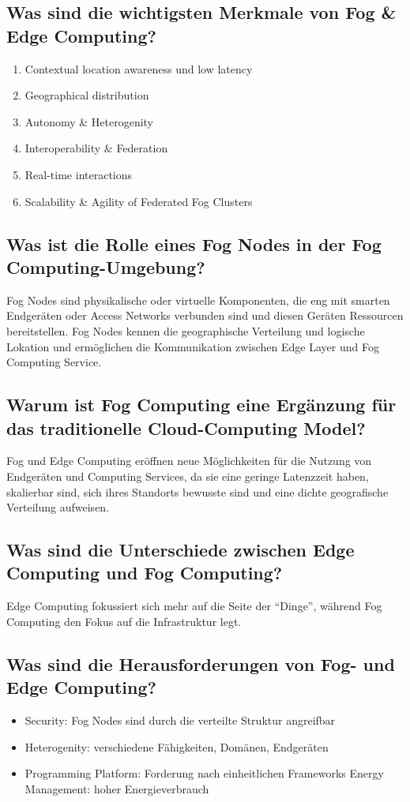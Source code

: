 \documentclass{article}
\begin{document}
\subsection{Was sind die wichtigsten Merkmale von Fog \& Edge Computing?}
\begin{enumerate}
    \item Contextual location awareness und low latency
    \item Geographical distribution
    \item Autonomy \& Heterogenity
    \item Interoperability \& Federation
    \item Real-time interactions
    \item Scalability \& Agility of Federated Fog Clusters
\end{enumerate}
\subsection{Was ist die Rolle eines Fog Nodes in der Fog Computing-Umgebung?}
Fog Nodes sind physikalische oder virtuelle Komponenten, die eng mit smarten Endgeräten oder Access Networks verbunden sind und diesen Geräten Ressourcen bereitstellen.
Fog Nodes kennen die geographische Verteilung und logische Lokation und ermöglichen die Kommunikation zwischen Edge Layer und Fog Computing Service.
\subsection{Warum ist Fog Computing eine Ergänzung für das traditionelle Cloud-Computing Model?}
Fog und Edge Computing eröffnen neue Möglichkeiten für die Nutzung von Endgeräten und Computing Services, da sie eine geringe Latenzzeit haben, skalierbar sind, sich ihres Standorts bewusste sind und eine dichte geografische Verteilung aufweisen.
\subsection{Was sind die Unterschiede zwischen Edge Computing und Fog Computing?}
Edge Computing fokussiert sich mehr auf die Seite der ``Dinge'', während Fog Computing den Fokus auf die Infrastruktur legt.
\subsection{Was sind die Herausforderungen von Fog- und Edge Computing?}
\begin{itemize}
    \item Security: Fog Nodes sind durch die verteilte Struktur angreifbar
    \item Heterogenity: verschiedene Fähigkeiten, Domänen, Endgeräten
    \item Programming Platform: Forderung nach einheitlichen Frameworks Energy Management: hoher Energieverbrauch
\end{itemize}
\end{document}
